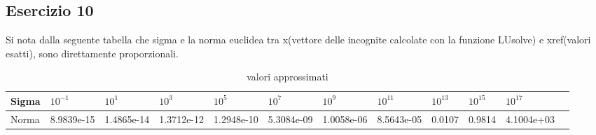 \subsection{Esercizio 10}
Si nota dalla seguente tabella che sigma e la norma euclidea tra x(vettore delle incognite calcolate con la funzione LUsolve) e xref(valori esatti), sono direttamente proporzionali.
\begin{table}[h]
\begin{tabular}{|l l l l l l l l l l l l|}
        \hline
        Sigma &$10^{-1}$ & $10^{1}$&$10^{3}$&$10^{5}$&$10^{7}$&$10^{9}$&$10^{11}$&$10^{13}$&$10^{15}$&$10^{17}$\\
        \hline
        Norma &8.9839e-15&1.4865e-14&1.3712e-12&1.2948e-10&5.3084e-09&1.0058e-06&8.5643e-05&0.0107&0.9814&   4.1004e+03\\
        
        \hline
\end{tabular}
\caption{valori approssimati}
\label{tab::1}     
\end{table}
